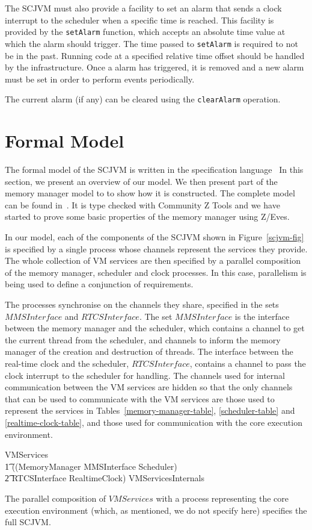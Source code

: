 \documentclass[a4paper,10pt]{report}
\begin{document}
The SCJVM must also provide a facility to set an alarm that sends a clock
interrupt to the scheduler when a specific time is reached. This facility is
provided by the \texttt{set\-Alarm} function, which accepts an absolute time
value at which the alarm should trigger. The time passed to \texttt{set\-Alarm}
is required to not be in the past. Running code at a specified relative time
offset should be handled by the infrastructure. Once a alarm has triggered, it
is removed and a new alarm must be set in order to perform events periodically.

The current alarm (if any) can be cleared using the \texttt{clear\-Alarm}
operation.

\section{Formal Model}
\label{formal-model-section}

The formal model of the SCJVM is written in the \Circus{} specification
language~\cite{oliveira2009} In this section, we present an overview of our
model. We then present part of the memory manager model to to show how it is
constructed. The complete model can be found in~\cite{baxter2015}. It is type
checked with Community Z Tools and we have started to prove some basic
properties of the memory manager using Z/Eves.

In our model, each of the components of the SCJVM shown in
Figure~\ref{scjvm-fig} is specified by a single process whose channels represent
the services they provide.  The whole collection of VM services are then
specified by a parallel composition of the memory manager, scheduler and clock
processes. In this case, parallelism is being used to define a conjunction of
requirements. 

The processes synchronise on the channels they share, specified in the
sets $MMSInterface$ and $RTCSInterface$. The set $MMSInterface$ is the interface
between the memory manager and the scheduler, which contains a channel to get
the current thread from the scheduler, and channels to inform the memory manager
of the creation and destruction of threads. The interface between the real-time
clock and the scheduler, $RTCSInterface$, contains a channel to pass the clock
interrupt to the scheduler for handling. The channels used for internal
communication between the VM services are hidden so that the only channels that
can be used to communicate with the VM services are those used to represent the
services in Tables~\ref{memory-manager-table}, \ref{scheduler-table} and
\ref{realtime-clock-table}, and those used for communication with the core
execution environment.
%
\begin{circus}
  VMServices \circdef \\
  \t1 ((MemoryManager \lpar MMSInterface \rpar Scheduler) \\
  \t2 \lpar RTCSInterface \rpar RealtimeClock) \circhide VMServicesInternals
\end{circus}
%
The parallel composition of $VMServices$ with a process representing the core
execution environment (which, as mentioned, we do not specify here)
specifies the full SCJVM.
\end{document}
